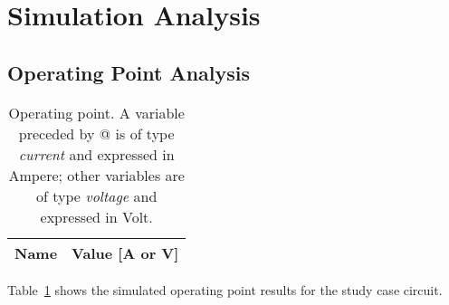\section{Simulation Analysis}
\label{sec:simulation}

\subsection{Operating Point Analysis}

\begin{table}[h]
  \centering
  \begin{tabular}{|l|r|}
    \hline    
    {\bf Name} & {\bf Value [A or V]} \\ \hline
    
  \end{tabular}
  \caption{Operating point. A variable preceded by @ is of type {\em current}
    and expressed in Ampere; other variables are of type {\it voltage} and expressed in
    Volt.}
  \label{tab:op}
\end{table}

Table~\ref{tab:op} shows the simulated operating point results for the study case circuit.

